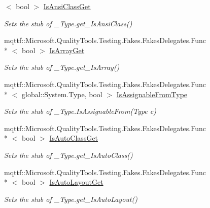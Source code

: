 \begin{DoxyCompactItemize}
$<$ bool $>$ \hyperlink{class_system_1_1_runtime_1_1_interop_services_1_1_fakes_1_1_stub___type_abc0b335506efb56409585aaf6f489833}{Is\-Ansi\-Class\-Get}
\begin{DoxyCompactList}\small\item\em Sets the stub of \-\_\-\-Type.\-get\-\_\-\-Is\-Ansi\-Class()\end{DoxyCompactList}\item 
mqttf\-::\-Microsoft.\-Quality\-Tools.\-Testing.\-Fakes.\-Fakes\-Delegates.\-Func\\*
$<$ bool $>$ \hyperlink{class_system_1_1_runtime_1_1_interop_services_1_1_fakes_1_1_stub___type_aee932b8f443e1f1d9d188164e9e383c2}{Is\-Array\-Get}
\begin{DoxyCompactList}\small\item\em Sets the stub of \-\_\-\-Type.\-get\-\_\-\-Is\-Array()\end{DoxyCompactList}\item 
mqttf\-::\-Microsoft.\-Quality\-Tools.\-Testing.\-Fakes.\-Fakes\-Delegates.\-Func\\*
$<$ global\-::\-System.\-Type, bool $>$ \hyperlink{class_system_1_1_runtime_1_1_interop_services_1_1_fakes_1_1_stub___type_ac2462ba30a1be8f55915dbbd18ef924f}{Is\-Assignable\-From\-Type}
\begin{DoxyCompactList}\small\item\em Sets the stub of \-\_\-\-Type.\-Is\-Assignable\-From(\-Type c)\end{DoxyCompactList}\item 
mqttf\-::\-Microsoft.\-Quality\-Tools.\-Testing.\-Fakes.\-Fakes\-Delegates.\-Func\\*
$<$ bool $>$ \hyperlink{class_system_1_1_runtime_1_1_interop_services_1_1_fakes_1_1_stub___type_adb9897a0b857ce33a79d1749c49d7035}{Is\-Auto\-Class\-Get}
\begin{DoxyCompactList}\small\item\em Sets the stub of \-\_\-\-Type.\-get\-\_\-\-Is\-Auto\-Class()\end{DoxyCompactList}\item 
mqttf\-::\-Microsoft.\-Quality\-Tools.\-Testing.\-Fakes.\-Fakes\-Delegates.\-Func\\*
$<$ bool $>$ \hyperlink{class_system_1_1_runtime_1_1_interop_services_1_1_fakes_1_1_stub___type_a85778e0d5f68032e285f8fbebbdde5ba}{Is\-Auto\-Layout\-Get}
\begin{DoxyCompactList}\small\item\em Sets the stub of \-\_\-\-Type.\-get\-\_\-\-Is\-Auto\-Layout()\end{DoxyCompactList}\item 

\end{DoxyCompactItemize}
